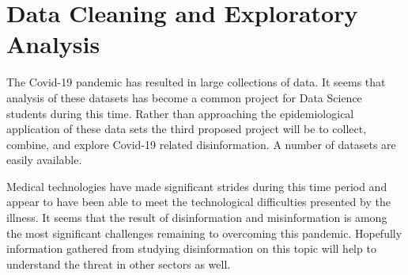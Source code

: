 \documentclass[conference]{IEEEtran}
\begin{document}
\section{Data Cleaning and Exploratory Analysis}

The Covid-19 pandemic has resulted in large collections of data.
It seems that analysis of these datasets has become a common project for Data Science students during this time.
Rather than approaching the epidemiological application of these data sets the third proposed project will be to collect, combine, and explore Covid-19 related disinformation.
A number of datasets are easily available.
\cite{Shapiro2021}

Medical technologies have made significant strides during this time period and appear to have been able to meet the technological difficulties presented by the illness.
It seems that the result of disinformation and misinformation is among the most significant challenges remaining to overcoming this pandemic.
Hopefully information gathered from studying disinformation on this topic will help to understand the threat in other sectors as well.



\clearpage


\end{document}
